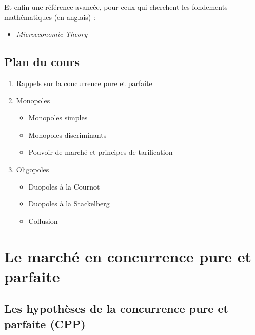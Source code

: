 \documentclass[
  a4paper,
]{book}
\providecommand{\tightlist}{%
  \setlength{\itemsep}{0pt}\setlength{\parskip}{0pt}}
\theoremstyle{definition}
\theoremstyle{definition}
\theoremstyle{definition}
\theoremstyle{definition}
\theoremstyle{remark}
\begin{document}
Et enfin une référence avancée, pour ceux qui cherchent les fondements mathématiques (en anglais) :

\begin{itemize}
\tightlist
\item
  \citet{mas1995} \emph{Microeconomic Theory}
\end{itemize}

\hypertarget{plan-du-cours}{%
\section{Plan du cours}\label{plan-du-cours}}

\begin{enumerate}
\def\labelenumi{\arabic{enumi}.}
\tightlist
\item
  Rappels sur la concurrence pure et parfaite
\item
  Monopoles

  \begin{itemize}
  \tightlist
  \item
    Monopoles simples
  \item
    Monopoles discriminants
  \item
    Pouvoir de marché et principes de tarification
  \end{itemize}
\item
  Oligopoles

  \begin{itemize}
  \tightlist
  \item
    Duopoles à la Cournot
  \item
    Duopoles à la Stackelberg
  \item
    Collusion
  \end{itemize}
\end{enumerate}

\hypertarget{le-marchuxe9-en-concurrence-pure-et-parfaite}{%
\chapter{Le marché en concurrence pure et parfaite}\label{le-marchuxe9-en-concurrence-pure-et-parfaite}}


\hypertarget{les-hypothuxe8ses-de-la-concurrence-pure-et-parfaite-cpp}{%
\section{Les hypothèses de la concurrence pure et parfaite (CPP)}\label{les-hypothuxe8ses-de-la-concurrence-pure-et-parfaite-cpp}}
\end{document}
